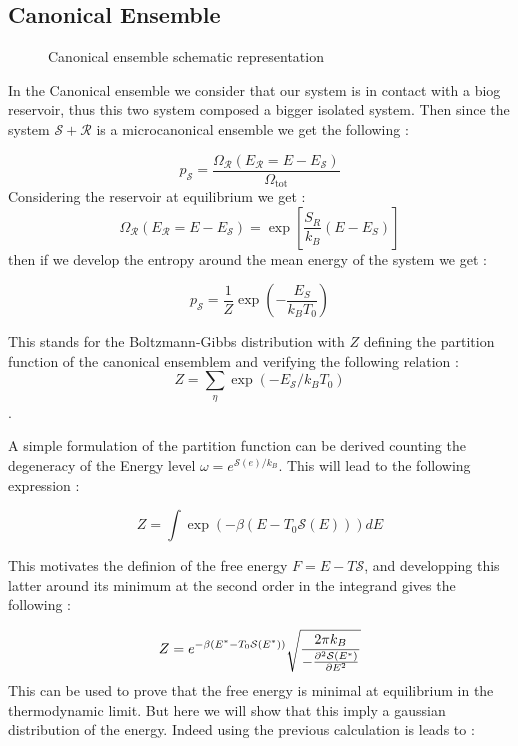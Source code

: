 \documentclass[ansiapaper]{report}
\begin{document}
\begin{multicols}{3}
\section{Canonical Ensemble}

\begin{figure}[H]
		\def\svgwidth{\linewidth}
		
        \caption{Canonical ensemble schematic representation}
        \vspace{0.15cm}
\end{figure}

In the Canonical ensemble we consider that our system is in contact with a biog reservoir, thus this two system composed a bigger isolated system. Then since the system $\mathcal{S} + \mathcal{R}$ is a microcanonical ensemble we get the following : 

$$ p_\mathcal{S} = \frac{\Omega_\mathcal{R}(E_\mathcal{R} =  E - E_\mathcal{S})}{\Omega_{\text{tot}}}$$
Considering the reservoir at equilibrium we get : 
$$\Omega_\mathcal{R}(E_\mathcal{R} =  E - E_\mathcal{S}) = \exp \left[ \frac{S_R}{k_B}(E - E_S)\right] $$
then if we develop the entropy around the mean energy of the system we get : 

$$ p_\mathcal{S} = \frac{1}{Z}\exp \left( - \frac{E_S}{k_B T_0}\right)$$

This stands for the Boltzmann-Gibbs distribution with $Z$ defining the partition function of the canonical ensemblem and verifying the following relation : 
$$ Z = \sum_\eta \exp(-E_{\mathcal{S}} / k_B T_0) $$.

A simple formulation of the partition function can be derived counting the degeneracy of the Energy level $\omega = e^{\mathcal{S}(e)/k_B}$. This will lead to the following expression : 

\begin{equation}
    Z = \int \exp(-\beta (E - T_0 \mathcal{S}(E))) dE
    \label{eq:partition_canonical}
\end{equation}

This motivates the definion of the free energy $F = E - T \mathcal{S}$, and developping this latter around its minimum at the second order in the integrand gives the following : 

\begin{equation}
    Z = e^{-\beta (E^* - T_0 \mathcal{S}(E^*))}\sqrt{\frac{2\pi k_B}{- \pdv[2]{\mathcal{S}(E^*)}{E}}} 
    \label{eq:partition_canonical}
\end{equation}
This can be used to prove that the free energy is minimal at equilibrium in the thermodynamic limit. But here we will show that this imply a gaussian distribution of the energy.  Indeed using the previous calculation is leads to : 


\end{multicols}
\end{document}
